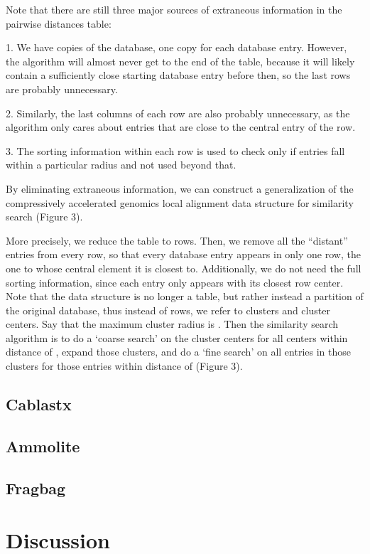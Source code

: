 \documentclass{amsbook}
\theoremstyle{definition}
\theoremstyle{remark}
\numberwithin{equation}{section}
\begin{document}
Note that there are still three major sources of extraneous information in the pairwise distances table:

1.
We have  copies of the database, one copy for each database entry.
However, the algorithm will almost never get to the end of the table, because it will likely contain a sufficiently close starting database entry before then, so the last rows are probably unnecessary.

2.
Similarly, the last columns of each row are also probably unnecessary, as the algorithm only cares about entries that are close to the central entry of the row.

3.
The sorting information within each row is used to check only if entries fall within a particular radius and not used beyond that.

By eliminating extraneous information, we can construct a generalization of the compressively accelerated genomics local alignment data structure for similarity search (Figure 3).

More precisely, we reduce the table to  rows.
Then, we remove all the “distant” entries from every row, so that every database entry appears in only one row, the one to whose central element it is closest to.
Additionally, we do not need the full sorting information, since each entry only appears with its closest row center.
Note that the data structure is no longer a table, but rather instead a partition of the original database, thus instead of rows, we refer to clusters and cluster centers.
Say that the maximum cluster radius is .
Then the similarity search algorithm is to do a ‘coarse search’ on the cluster centers for all centers within distance  of , expand those clusters, and do a ‘fine search’ on all entries in those clusters for those entries within distance  of  (Figure 3).

\section{Cablastx}

\section{Ammolite}

\section{Fragbag}

\chapter{Discussion}
\end{document}
